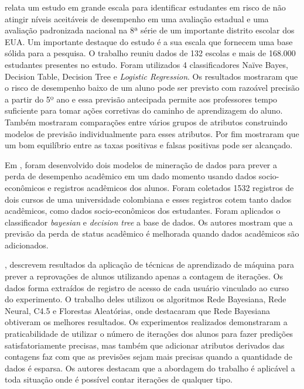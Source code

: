 \documentclass[ti]{texufpel} %
\begin{document}
\citet{tamhane2014predicting} relata um estudo em grande escala para identificar estudantes em risco de não atingir níveis aceitáveis de desempenho em uma avaliação estadual e uma avaliação padronizada nacional na 8ª série de um importante distrito escolar dos EUA. Um importante destaque do estudo é a sua escala que fornecem uma base sólida para a pesquisa. O trabalho reuniu dados de 132 escolas e mais de 168.000 estudantes presentes no estudo. Foram utilizados 4 classificadores {Naïve Bayes}, {Decision Table}, {Decision Tree} e \textit{Logistic Regression}. Os resultados mostraram que o risco de desempenho baixo de um aluno pode ser previsto com razoável precisão a partir do 5º ano e essa previsão antecipada permite aos professores tempo suficiente para tomar ações corretivas do caminho de aprendizagem do aluno. Também mostraram comparações entre vários grupos de atributos construindo modelos de previsão individualmente para esses atributos. Por fim mostraram que um bom equilíbrio entre as taxas positivas e falsas positivas pode ser alcançado.

Em \citet{guarin2015model}, foram desenvolvido dois modelos de mineração de dados para prever a perda de desempenho acadêmico em um dado momento usando dados socio-econômicos e registros acadêmicos dos alunos. Foram coletados 1532 registros de dois cursos de uma universidade colombiana e esses registros cotem tanto dados acadêmicos, como dados socio-econômicos dos estudantes. Foram aplicados o classificador \textit{bayesian} e \textit{decision tree} a base de dados. Os autores mostram que a previsão da perda de status acadêmico é melhorada quando dados acadêmicos são adicionados.

\citet{detoni2015modelagem}, descrevem resultados da aplicação de técnicas de aprendizado de máquina para prever a reprovações de alunos utilizando apenas a contagem de iterações. Os dados forma extraídos de registro de acesso de cada usuário vinculado ao curso do experimento. O trabalho deles utilizou os algoritmos Rede Bayesiana, Rede Neural, C4.5 e Florestas Aleatórias, onde destacaram que Rede Bayesiana obtiveram os melhores resultados. Os experimentos realizados demonstraram a praticabilidade de utilizar o número de iterações dos alunos para fazer predições satisfatoriamente precisas, mas também que adicionar atributos derivados das contagens faz com que as previsões sejam mais precisas quando a quantidade de dados é esparsa. Os autores destacam que a abordagem do trabalho é aplicável a toda situação onde é possível contar iterações de qualquer tipo.
\end{document}
